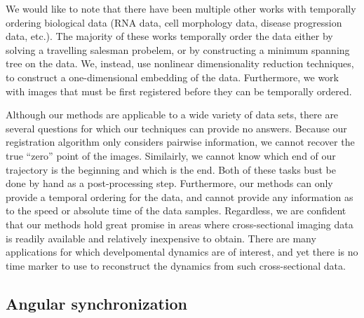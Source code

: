 \documentclass{pnastwo}
\begin{document}
\begin{article}
We would like to note that there have been multiple other works with temporally ordering biological data (RNA data, cell morphology data, disease progression data, etc.). 
%
The majority of these works temporally order the data either by solving a travelling salesman probelem, or by constructing a minimum spanning tree on the data.
%
We, instead, use nonlinear dimensionality reduction techniques, to construct a one-dimensional embedding of the data.
%
Furthermore, we work with images that must be first registered before they can be temporally ordered.

Although our methods are applicable to a wide variety of data sets, there are several questions for which our techniques can provide no answers.
%
Because our registration algorithm only considers pairwise information, we cannot recover the true ``zero'' point of the images. 
%
Similairly, we cannot know which end of our trajectory is the beginning and which is the end.
%
Both of these tasks bust be done by hand as a post-processing step.
%
Furthermore, our methods can only provide a temporal ordering for the data, and cannot provide any information as to the speed or absolute time of the data samples.
%
Regardless, we are confident that our methods hold great promise in areas where cross-sectional imaging data is readily available and relatively inexpensive to obtain. 
%
There are many applications for which develpomental dynamics are of interest, and yet there is no time marker to use to reconstruct the dynamics from such cross-sectional data. 





\begin{materials}

\section{Angular synchronization}


\end{materials}
\end{article}
\end{document}
